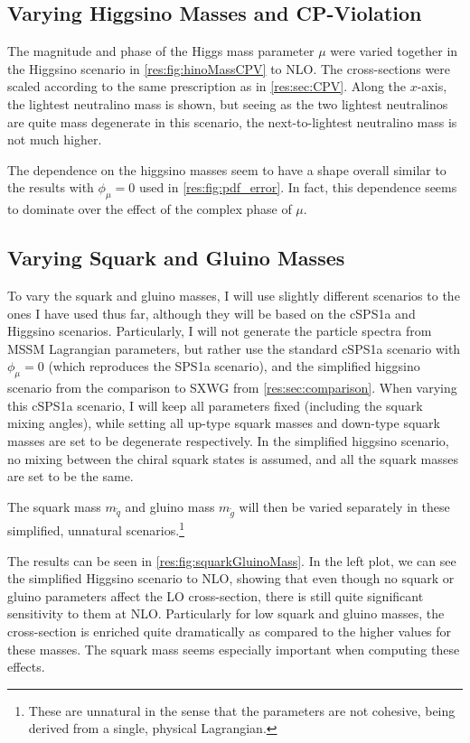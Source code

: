 \documentclass[../main.tex]{subfiles}
\begin{document}
\subsection{Varying Higgsino Masses and CP-Violation}
The magnitude and phase of the Higgs mass parameter \(\mu\) were varied together in the Higgsino scenario in \cref{res:fig:hinoMassCPV} to NLO\@.
The cross-sections were scaled according to the same prescription as in \cref{res:sec:CPV}.
Along the \(x\)-axis, the lightest neutralino mass is shown, but seeing as the two lightest neutralinos are quite mass degenerate in this scenario, the next-to-lightest neutralino mass is not much higher.

The dependence on the higgsino masses seem to have a shape overall similar to the results with \(\phi_\mu = 0\) used in \cref{res:fig:pdf_error}.
In fact, this dependence seems to dominate over the effect of the complex phase of \(\mu\).


\subsection{Varying Squark and Gluino Masses}
To vary the squark and gluino masses, I will use slightly different scenarios to the ones I have used thus far, although they will be based on the cSPS1a and Higgsino scenarios.
Particularly, I will not generate the particle spectra from MSSM Lagrangian parameters, but rather use the standard cSPS1a scenario with \(\phi_\mu = 0\) (which reproduces the SPS1a scenario), and the simplified higgsino scenario from the comparison to SXWG from \cref{res:sec:comparison}.
When varying this cSPS1a scenario, I will keep all parameters fixed (including the squark mixing angles), while setting all up-type squark masses and down-type squark masses are set to be degenerate respectively.
In the simplified higgsino scenario, no mixing between the chiral squark states is assumed, and all the squark masses are set to be the same.

The squark mass \(m_{\tilde{q}}\) and gluino mass \(m_{\tilde{g}}\) will then be varied separately in these simplified, unnatural scenarios.\footnote{These are unnatural in the sense that the parameters are not cohesive, being derived from a single, physical Lagrangian.}
\medskip

The results can be seen in \cref{res:fig:squarkGluinoMass}.
In the left plot, we can see the simplified Higgsino scenario to NLO, showing that even though no squark or gluino parameters affect the LO cross-section, there is still quite significant sensitivity to them at NLO\@.
Particularly for low squark and gluino masses, the cross-section is enriched quite dramatically as compared to the higher values for these masses.
The squark mass seems especially important when computing these effects.
\medskip
\end{document}
